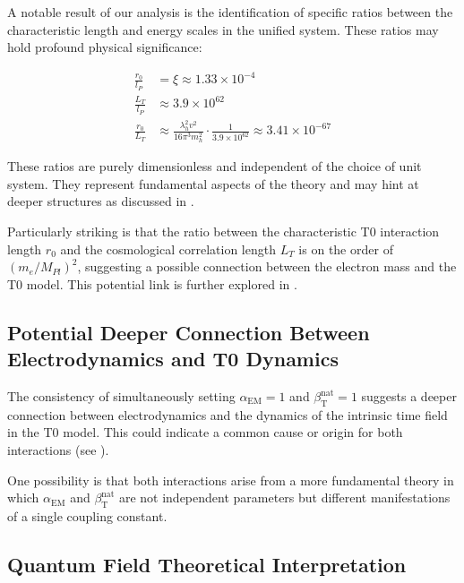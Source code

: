 \documentclass[12pt,a4paper]{article}
\newcommand{\alphaEM}{\alpha_{\text{EM}}}
\newcommand{\betaT}{\beta_{\text{T}}}
\begin{document}
	A notable result of our analysis is the identification of specific ratios between the characteristic length and energy scales in the unified system. These ratios may hold profound physical significance:
	
	\begin{tcolorbox}[colback=blue!5!white,colframe=blue!75!black,title=Fundamental Ratios in the Unified Unit System]
		\begin{align}
			\frac{r_0}{l_P} &= \xi \approx 1.33 \times 10^{-4} \\
			\frac{L_T}{l_P} &\approx 3.9 \times 10^{62} \\
			\frac{r_0}{L_T} &\approx \frac{\lambda_h^2 v^2}{16\pi^3 m_h^2} \cdot \frac{1}{3.9 \times 10^{62}} \approx 3.41 \times 10^{-67}
		\end{align}
	\end{tcolorbox}
	
	These ratios are purely dimensionless and independent of the choice of unit system. They represent fundamental aspects of the theory and may hint at deeper structures as discussed in \cite{pascher_planck_2025}.
	
	Particularly striking is that the ratio between the characteristic T0 interaction length \(r_0\) and the cosmological correlation length \(L_T\) is on the order of \((m_e/M_{Pl})^2\), suggesting a possible connection between the electron mass and the T0 model. This potential link is further explored in \cite{pascher_galaxies_2025}.
	
	\subsection{Potential Deeper Connection Between Electrodynamics and T0 Dynamics}
	\label{subsec:deeper_connection}
	
	The consistency of simultaneously setting \(\alphaEM = 1\) and \(\betaT^{\text{nat}} = 1\) suggests a deeper connection between electrodynamics and the dynamics of the intrinsic time field in the T0 model. This could indicate a common cause or origin for both interactions (see \cite{pascher_feldtheorie_2025}).
	
	One possibility is that both interactions arise from a more fundamental theory in which \(\alphaEM\) and \(\betaT^{\text{nat}}\) are not independent parameters but different manifestations of a single coupling constant.
	
	\subsection{Quantum Field Theoretical Interpretation}
	\label{subsec:qft_interpretation}
	
\end{document}
